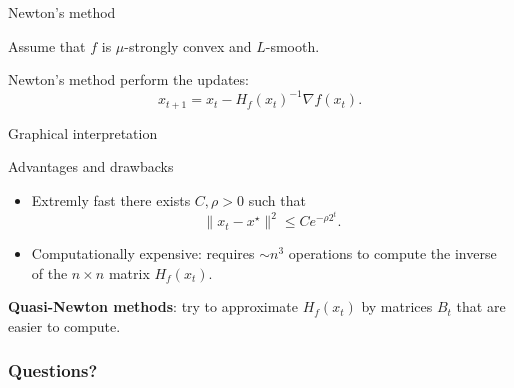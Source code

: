\documentclass{beamer}
\begin{document}
\begin{frame}[t]{Newton's method}
	\grid

	\vspace{-0.2cm}
	Assume that $f$ is $\mu$-strongly convex and $L$-smooth.
		\vspace{-0.3cm}
	\begin{exampleblock}{}
		Newton's method perform the updates:
		$$
		x_{t+1} = x_t - H_f(x_t)^{-1} \nabla f(x_t).
		$$
	\end{exampleblock}
\end{frame}

\begin{frame}[t]{Graphical interpretation}
	\grid


\end{frame}

\begin{frame}[t]{Advantages and drawbacks}
	\grid

			\vspace{-0.2cm}
	\begin{itemize}
		\item Extremly fast there exists $C,\rho > 0$ such that
			$$
			\|x_t - x^{\star} \|^{2} \leq C e^{- \rho 2^t}.
			$$
		\item Computationally expensive: requires $\sim n^3$ operations to compute the inverse of the $n \times n$ matrix $H_f(x_t)$.
	\end{itemize}

			\vspace{0.5cm}
	\textbf{Quasi-Newton methods}: try to approximate $H_f(x_t)$ by matrices $B_t$ that are easier to compute.

\end{frame}


\appendix
\backupbegin
\begin{frame}[t]
	\frametitle{Questions?}
	\grid

	\pause
\end{frame}
\backupend
\end{document}
